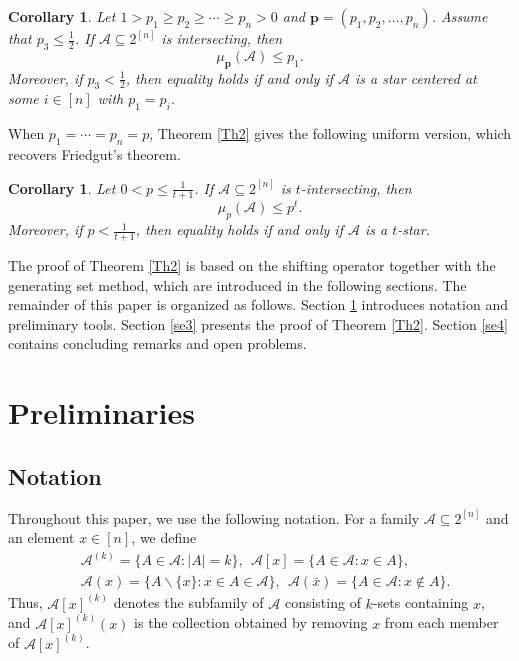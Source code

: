 \documentclass[11pt]{article}
\newtheorem{corollary}[theorem]{Corollary}
\begin{document}
\begin{corollary}\label{cr1}
Let $1 > p_1 \ge p_2 \ge \cdots \ge p_n > 0$ and $\textbf{p}=(p_1,p_2,\ldots,p_n)$. 
Assume that $p_3 \leq \frac{1}{2}$. 
If $\mathcal{A} \subseteq 2^{[n]}$ is intersecting, then
$$
\mu_{\mathbf{p}}(\mathcal{A}) \le p_1 .
$$
Moreover, if $p_3  < \frac{1}{2}$, then equality holds if and only if $\mathcal{A}$ is a  star centered at some $i \in [n]$ with $p_1 = p_i$.
\end{corollary}

When $ p_1 = \cdots = p_n = p$, Theorem  \ref{Th2} gives the following uniform version, which recovers Friedgut's  theorem.

\begin{corollary}\cite{F08}\label{cr2}
Let $0<p\leq \frac{1}{t+1}$. 
If $\mathcal{A} \subseteq 2^{[n]}$ is $t$-intersecting, then
$$
\mu_p(\mathcal{A}) \le p^t .
$$
Moreover, if $p  <  \frac{1}{t+1}$, then equality holds if and only if $\mathcal{A}$ is a $t$-star.
\end{corollary}


The proof of Theorem  \ref{Th2} is based on the shifting operator together with the generating  set method, which are introduced  in the following sections.
The remainder of this  paper is organized as follows. Section \ref{se2} introduces notation and preliminary tools. Section \ref{se3} presents the proof of Theorem  \ref{Th2}. Section \ref{se4} contains concluding remarks and open problems.

\section{Preliminaries}\label{se2}

\subsection{Notation}

Throughout this paper, we use the following notation. For a family $\mathcal{A}\subseteq 2^{[n]}$ and an element $x\in[n]$, we define
\begin{align*}
&\mathcal{A}^{(k)}=\{A\in\mathcal{A}: |A|=k\},~~\mathcal{A} [x]=\{A\in \mathcal{A}: x\in A\},\\
&\mathcal{A} (x)=\{A\backslash\{x\}: x\in A\in \mathcal{A}\},~~\mathcal{A}(\bar{x})=\{A\in\mathcal{A}: x\notin A\}.
\end{align*}
Thus, $\mathcal{A}[x]^{(k)}$ denotes the subfamily of $\mathcal{A}$ consisting of $k$-sets containing $x$, and $\mathcal{A}[x]^{(k)}(x)$ is the collection obtained by removing $x$ from each member of $\mathcal{A}[x]^{(k)}$.
\end{document}
